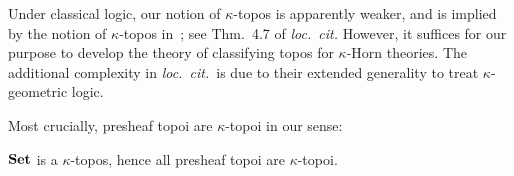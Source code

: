 \begin{remark}
  Under classical logic, our notion of $\kappa$-topos is apparently weaker, and is implied by the notion of $\kappa$-topos in~\citet{espindola_every_nodate}; see Thm.~4.7 of \emph{loc.\ cit.} However, it suffices for our purpose to develop the theory of classifying topos for $\kappa$-Horn theories. The additional complexity in \emph{loc.\ cit.}\ is due to their extended generality to treat $\kappa$-geometric logic.
\end{remark}

Most crucially, presheaf topoi are $\kappa$-topoi in our sense:

\begin{proposition}\label{prop:presheafiskappatopos}
  $\mathbf{Set}$ is a $\kappa$-topos, hence all presheaf topoi are $\kappa$-topoi.
\end{proposition}
